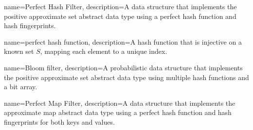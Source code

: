 {
    name={Perfect Hash Filter},
    description={A data structure that implements the positive approximate set abstract data type using a perfect hash function and hash fingerprints.}
}

{
    name={perfect hash function},
    description={A hash function that is injective on a known set $S$, mapping each element to a unique index.}
}

{
    name={Bloom filter},
    description={A probabilistic data structure that implements the positive approximate set abstract data type using multiple hash functions and a bit array.}
}

{
    name={Perfect Map Filter},
    description={A data structure that implements the approximate map abstract data type using a perfect hash function and hash fingerprints for both keys and values.}
}
